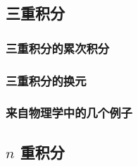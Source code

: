 






\subsection{三重积分}
\subsubsection{三重积分的累次积分}
\subsubsection{三重积分的换元}
\subsubsection{来自物理学中的几个例子}

\subsection{$n$ 重积分}
